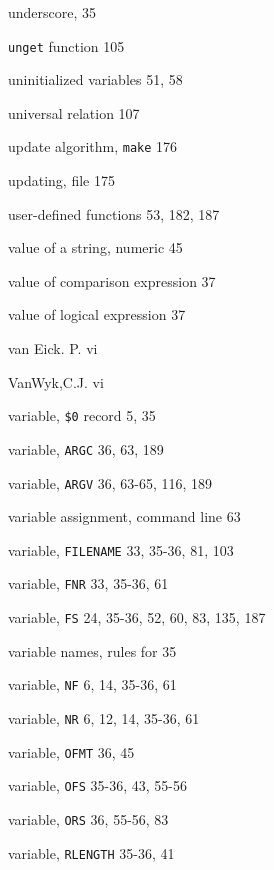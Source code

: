 \begin{multicols}{3}
\hangindent=3pc  underscore, 35

\hangindent=3pc  \verb'unget' function 105

\hangindent=3pc  uninitialized variables 51, 58

\hangindent=3pc  universal relation 107

\hangindent=3pc  update algorithm, \verb'make' 176

\hangindent=3pc  updating, file 175

\hangindent=3pc  user-defined functions 53, 182,  187

\hangindent=3pc  value of a string, numeric 45

\hangindent=3pc  value of comparison expression 37

\hangindent=3pc  value of logical expression 37

\hangindent=3pc  van Eick. P. vi

\hangindent=3pc  VanWyk,C.J. vi

\hangindent=3pc  variable, \verb'$0' record 5, 35

\hangindent=3pc  variable, \verb'ARGC' 36, 63, 189

\hangindent=3pc  variable, \verb'ARGV' 36, 63-65, 116, 189

\hangindent=3pc  variable assignment, command line 63

\hangindent=3pc  variable, \verb'FILENAME' 33, 35-36, 81, 103

\hangindent=3pc  variable, \verb'FNR' 33, 35-36, 61

\hangindent=3pc  variable, \verb'FS' 24, 35-36, 52, 60, 83, 135, 187

\hangindent=3pc  variable names, rules for 35

\hangindent=3pc  variable, \verb'NF' 6, 14, 35-36, 61

\hangindent=3pc  variable, \verb'NR' 6, 12, 14, 35-36, 61

\hangindent=3pc  variable, \verb'OFMT' 36, 45

\hangindent=3pc  variable, \verb'OFS' 35-36, 43, 55-56

\hangindent=3pc  variable, \verb'ORS' 36, 55-56, 83

\hangindent=3pc  variable, \verb'RLENGTH' 35-36, 41


\end{multicols}
